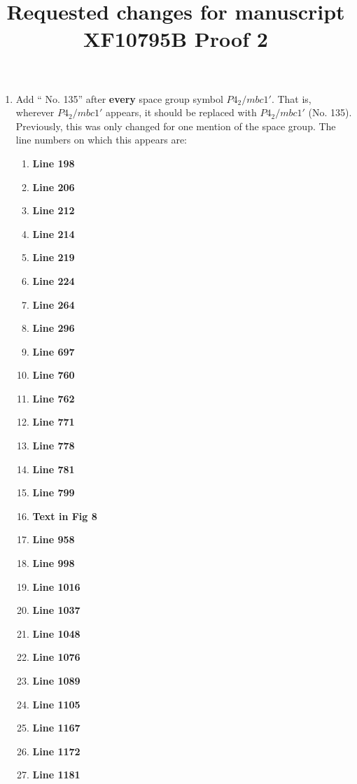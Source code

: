 \documentclass[aps,reprint,notitlepage,onecolumn,12pt]{revtex4-2}
\numberwithin{equation}{section}
\begin{document}
\title{Requested changes for manuscript XF10795B Proof 2}
\maketitle
\begin{enumerate}
    \item Add `` No. 135'' after \textbf{every} space group symbol $P4_2/mbc1'$. That is, wherever $P4_2/mbc1'$ appears, it should be replaced with $P4_2/mbc1'$ (No. 135). Previously, this was only changed for one mention of the space group. The line numbers on which this appears are:
    \begin{enumerate}
        \item \textbf{Line 198}
        \item \textbf{Line 206}
        \item \textbf{Line 212}
        \item \textbf{Line 214}
        \item \textbf{Line 219}
        \item \textbf{Line 224}
        \item \textbf{Line 264}
        \item \textbf{Line 296}
        \item \textbf{Line 697}
        \item \textbf{Line 760}
        \item \textbf{Line 762}
        \item \textbf{Line 771}
        \item \textbf{Line 778}
        \item \textbf{Line 781}
        \item \textbf{Line 799}
        \item \textbf{Text in Fig 8}
        \item \textbf{Line 958}
        \item \textbf{Line 998}
        \item \textbf{Line 1016}
        \item \textbf{Line 1037}
        \item \textbf{Line 1048}
        \item \textbf{Line 1076}
        \item \textbf{Line 1089}
        \item \textbf{Line 1105}
        \item \textbf{Line 1167}
        \item \textbf{Line 1172}
        \item \textbf{Line 1181}

\end{enumerate}
\end{enumerate}
\end{document}
